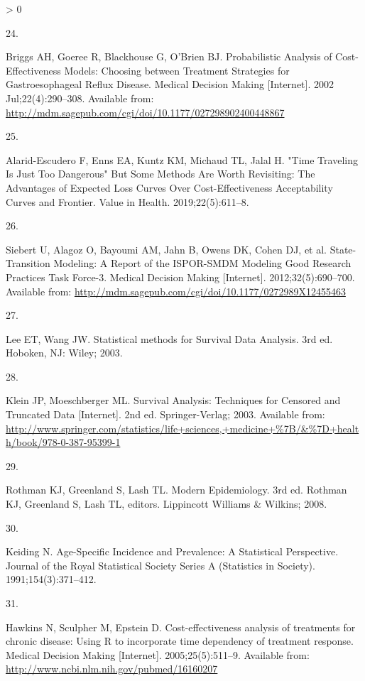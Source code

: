 \documentclass[
]{article}
\newlength{\cslhangindent}
\newlength{\csllabelwidth}
\newenvironment{CSLReferences}[2] %
 {%
  \setlength{\parindent}{0pt}
  \ifodd #1 \everypar{\setlength{\hangindent}{\cslhangindent}}\ignorespaces\fi
  \ifnum #2 > 0
  \setlength{\parskip}{#2\baselineskip}
  \fi
 }%
 {}
\newcommand{\CSLLeftMargin}[1]{\parbox[t]{\csllabelwidth}{#1}}
\newcommand{\CSLRightInline}[1]{\parbox[t]{\linewidth - \csllabelwidth}{#1}\break}
\begin{document}
\begin{CSLReferences}{0}{0}
\leavevmode\hypertarget{ref-Briggs2002}{}%
\CSLLeftMargin{24. }
\CSLRightInline{Briggs AH, Goeree R, Blackhouse G, O'Brien BJ. {Probabilistic Analysis of Cost-Effectiveness Models: Choosing between Treatment Strategies for Gastroesophageal Reflux Disease}. Medical Decision Making {[}Internet{]}. 2002 Jul;22(4):290--308. Available from: \url{http://mdm.sagepub.com/cgi/doi/10.1177/027298902400448867}}

\leavevmode\hypertarget{ref-Alarid-Escudero2019}{}%
\CSLLeftMargin{25. }
\CSLRightInline{Alarid-Escudero F, Enns EA, Kuntz KM, Michaud TL, Jalal H. {"Time Traveling Is Just Too Dangerous" But Some Methods Are Worth Revisiting: The Advantages of Expected Loss Curves Over Cost-Effectiveness Acceptability Curves and Frontier}. Value in Health. 2019;22(5):611--8. }

\leavevmode\hypertarget{ref-Siebert2012c}{}%
\CSLLeftMargin{26. }
\CSLRightInline{Siebert U, Alagoz O, Bayoumi AM, Jahn B, Owens DK, Cohen DJ, et al. {State-Transition Modeling: A Report of the ISPOR-SMDM Modeling Good Research Practices Task Force-3}. Medical Decision Making {[}Internet{]}. 2012;32(5):690--700. Available from: \url{http://mdm.sagepub.com/cgi/doi/10.1177/0272989X12455463}}

\leavevmode\hypertarget{ref-Lee2003a}{}%
\CSLLeftMargin{27. }
\CSLRightInline{Lee ET, Wang JW. {Statistical methods for Survival Data Analysis}. 3rd ed. Hoboken, NJ: Wiley; 2003. }

\leavevmode\hypertarget{ref-Klein2003}{}%
\CSLLeftMargin{28. }
\CSLRightInline{Klein JP, Moeschberger ML. {Survival Analysis: Techniques for Censored and Truncated Data} {[}Internet{]}. 2nd ed. Springer-Verlag; 2003. Available from: \url{http://www.springer.com/statistics/life+sciences,+medicine+\%7B/\&\%7D+health/book/978-0-387-95399-1}}

\leavevmode\hypertarget{ref-Rothman2008h}{}%
\CSLLeftMargin{29. }
\CSLRightInline{Rothman KJ, Greenland S, Lash TL. {Modern Epidemiology}. 3rd ed. Rothman KJ, Greenland S, Lash TL, editors. Lippincott Williams {\&} Wilkins; 2008. }

\leavevmode\hypertarget{ref-Keiding1991}{}%
\CSLLeftMargin{30. }
\CSLRightInline{Keiding N. {Age-Specific Incidence and Prevalence: A Statistical Perspective}. Journal of the Royal Statistical Society Series A (Statistics in Society). 1991;154(3):371--412. }

\leavevmode\hypertarget{ref-Hawkins2005}{}%
\CSLLeftMargin{31. }
\CSLRightInline{Hawkins N, Sculpher M, Epstein D. {Cost-effectiveness analysis of treatments for chronic disease: Using R to incorporate time dependency of treatment response.} Medical Decision Making {[}Internet{]}. 2005;25(5):511--9. Available from: \url{http://www.ncbi.nlm.nih.gov/pubmed/16160207}}


\end{CSLReferences}
\end{document}
